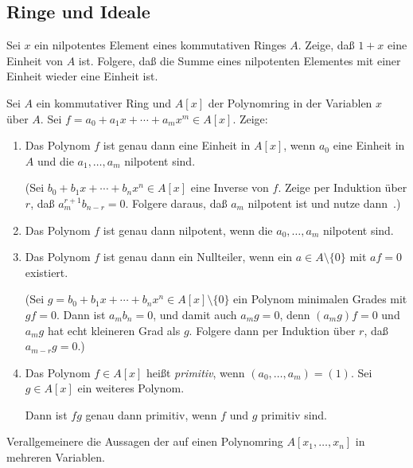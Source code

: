 \subsection{Ringe und Ideale}

\begin{exercise}
	\label{exer:sum_unit_nilp}
	Sei \(x\) ein nilpotentes Element eines kommutativen Ringes \(A\). Zeige,
	daß \(1 + x\) eine Einheit von \(A\) ist. Folgere, daß die Summe eines
	nilpotenten Elementes mit einer Einheit wieder eine Einheit ist.
\end{exercise}

\begin{exercise}
	\label{exer:polys}
	Sei \(A\) ein kommutativer Ring und \(A[x]\) der Polynomring in der
	Variablen \(x\) über \(A\). Sei \(f = a_0 + a_1 x + \dotsb + a_m x^m
	\in A[x]\). Zeige:
	\begin{enumerate}
	\item
		Das Polynom \(f\) ist genau dann eine Einheit in \(A[x]\), wenn \(a_0\)
		eine Einheit in \(A\) und die \(a_1, \dotsc, a_m\) nilpotent sind.
		
		(Sei \(b_0 + b_1 x + \dotsb + b_n x^n \in A[x]\) eine Inverse von \(f\).
		Zeige per Induktion über \(r\), daß \(a_m^{r + 1} b_{n - r} = 0\).
		Folgere daraus, daß \(a_m\) nilpotent ist und nutze
		dann~.)
	\item
		Das Polynom \(f\) ist genau dann nilpotent, wenn die \(a_0, \dotsc, a_m\)
		nilpotent sind.
	\item
		Das Polynom \(f\) ist genau dann ein Nullteiler, wenn ein \(a \in A \setminus
		\{0\}\) mit \(a f = 0\) existiert.
		
		(Sei \(g = b_0 + b_1 x + \dotsb + b_n x^n \in A[x] \setminus \{0\}\) ein
		Polynom minimalen Grades mit \(g f = 0\). Dann ist \(a_m b_n = 0\), und damit
		auch \(a_m g = 0\), denn \((a_m g) f = 0\) und \(a_m g\) hat echt kleineren
		Grad als \(g\). Folgere dann per Induktion über \(r\), daß
		\(a_{m - r} g = 0\).)
	\item
		Das Polynom \(f \in A[x]\) heißt \emph{primitiv}, wenn
		\((a_0, \dotsc, a_m) = (1)\). Sei \(g \in A[x]\) ein weiteres Polynom.
		
		Dann ist \(fg\) genau dann primitiv, wenn \(f\) und \(g\) primitiv sind.
	\end{enumerate}
\end{exercise}

\begin{exercise}
	Verallgemeinere die Aussagen der  auf einen Polynomring
	\(A[x_1, \dotsc, x_n]\) in mehreren Variablen.
\end{exercise}

